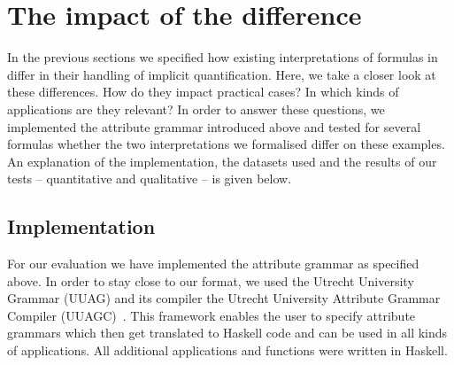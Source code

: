 
\section{The impact of the difference}\label{eva}
In the previous sections we 
specified how existing interpretations of formulas in \nthreelogic differ in their handling of implicit quantification. Here, 
we take a closer look at these differences. 
How do they impact 
practical cases? In which kinds of applications are they relevant?
In order to answer these questions, we implemented the attribute grammar introduced above and tested for several formulas
whether the two interpretations we formalised 
differ on these examples. %
An explanation of the implementation, the datasets used and the results of our tests -- quantitative and qualitative -- is given below. 

\subsection{Implementation}\label{imp}
For our evaluation we have implemented the attribute grammar as specified above. 
In order to stay close to our format, we used the Utrecht University Grammar (UUAG) and its compiler 
the Utrecht University Attribute Grammar Compiler (UUAGC)~\cite{uuag}. This framework enables the user to specify attribute grammars which 
then get translated to Haskell code and can be used in all kinds of applications. All additional applications and functions were written in Haskell.
%
% 


